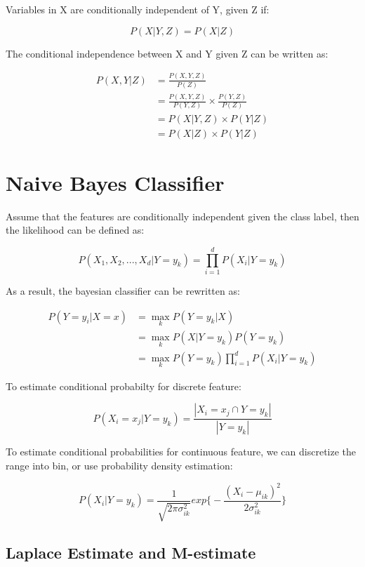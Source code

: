 \begin{multicols*}{2}
\noindent Variables in X are conditionally independent of Y, given Z if:

$$P(X|Y,Z) = P(X|Z)$$ 

\noindent The conditional independence between X and Y given Z can be written as:

\begin{equation*}
\begin{split}
    P(X,Y|Z) &= \frac{P(X,Y,Z)}{P(Z)}\\
    &= \frac{P(X,Y,Z)}{P(Y,Z)}\times \frac{P(Y,Z)}{P(Z)} \\
    &= P(X|Y,Z) \times P(Y|Z) \\
    &= P(X|Z) \times P(Y|Z)
\end{split}
\end{equation*}

\section{Naive Bayes Classifier}

\noindent Assume that the features are conditionally independent given the class label, then the likelihood can be defined as:

$$P(X_1, X_2, ..., X_d|Y = y_{k}) = \prod_{i=1}^{d} P(X_{i}|Y = y_{k})$$

\noindent As a result, the bayesian classifier can be rewritten as:

\begin{equation*}
\begin{split}
    P(Y=y_{i}|X=x) &= \!\max_{k} P(Y=y_{k}|X) \\
    &= \!\max_{k} P(X | Y = y_k) P(Y= y_k) \\
    &= \!\max_{k} P(Y=y_k) \prod_{i=1}^{d} P(X_{i}|Y = y_{k})
\end{split}
\end{equation*}

\noindent To estimate conditional probabilty for discrete feature:

$$P(X_i=x_j|Y=y_k) = \frac{|X_i = x_j \cap Y=y_k|}{|Y=y_k|}$$

\noindent To estimate conditional probabilities for continuous feature, we can discretize the range into bin, or use probability density estimation:

$$P(X_{i}| Y=y_{k}) = \frac{1}{\sqrt{2 \pi \sigma^{2}_{ik}}} exp \bigg\{ - \frac{(X_{i} - \mu_{ik})^{2} }{2 \sigma^{2}_{ik}} \bigg\}$$

\subsection{Laplace Estimate and M-estimate}


\end{multicols*}
